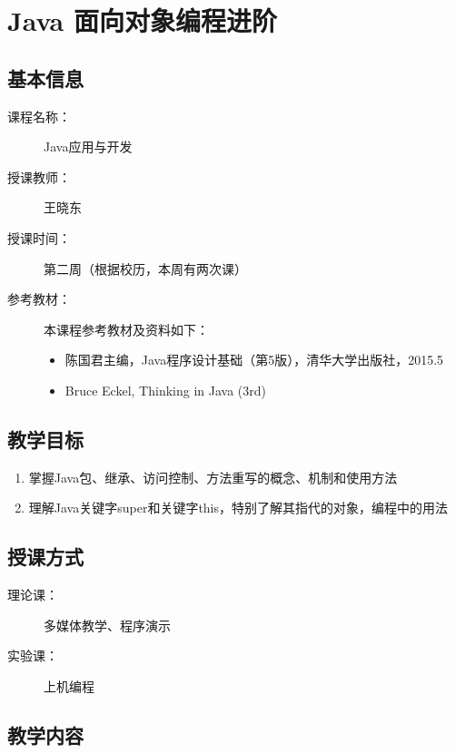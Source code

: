 \chapter{Java 面向对象编程进阶}
\label{chp:Advanced-object-oriented-programming}

\section*{基本信息}
\sline
\begin{description}
\item[课程名称：] Java应用与开发
\item[授课教师：] 王晓东
\item[授课时间：] 第二周（根据校历，本周有两次课）
\item[参考教材：] 本课程参考教材及资料如下：
  \begin{itemize}
  \item 陈国君主编，Java程序设计基础（第5版），清华大学出版社，2015.5
  \item Bruce Eckel, Thinking in Java (3rd)
  \end{itemize}
\end{description}

\section*{教学目标}

\sline

\begin{enumerate}
\item 掌握Java包、继承、访问控制、方法重写的概念、机制和使用方法
\item 理解Java关键字super和关键字this，特别了解其指代的对象，编程中的用法
\end{enumerate}

\section*{授课方式}

\sline
\begin{description}
\item[理论课：] 多媒体教学、程序演示
\item[实验课：] 上机编程
\end{description}

\newpage
\section*{教学内容}
\sline

